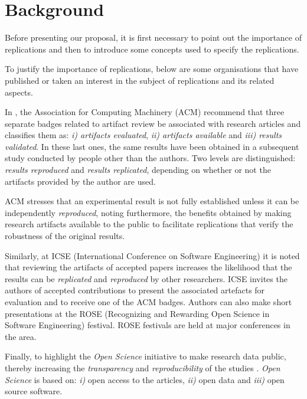 
\section{Background}
\label{sec:background}

Before presenting our proposal, it is first necessary to point out the importance of replications and then to introduce some concepts used to specify the replications.

To justify the importance of replications, below are some organisations that have published or taken an interest in the subject of replications and its related aspects.

In \cite{acm}, the Association for Computing Machinery (ACM) recommend that three separate badges related to artifact review be associated with research articles and classifies them as: \emph{i) artifacts evaluated}, \emph{ii) artifacts available} and \emph{iii) results validated}. In these last ones, the same results have been obtained in a subsequent study conducted by people other than the authors. Two levels are distinguished: \emph{results reproduced} and \emph{results replicated}, depending on whether or not the artifacts provided by the author are used.

ACM stresses that an experimental result is not fully established unless it can be independently \emph{reproduced}, noting furthermore, the benefits obtained by making research artifacts available to the public to facilitate replications that verify the robustness of the original results.

Similarly, at ICSE (International Conference
on Software Engineering) it is noted that reviewing the artifacts of accepted papers increases the likelihood that the results can be  \emph{replicated} and \emph{reproduced} by other researchers. 
ICSE invites the authors of accepted contributions to present the associated artefacts for evaluation and to receive one of the ACM badges.  Authors can also make short presentations at the ROSE (Recognizing and Rewarding Open Science in Software Engineering) festival. ROSE festivals are held at major conferences in the area.

Finally, to highlight the \emph{Open Science} initiative to make research data public, thereby increasing the \emph{transparency} and \emph{reproducibility} of the studies \cite{fernandez2019open}.
\emph{Open Science} is based on: \emph{i)} open access to the articles, \emph{ii)} open data and \emph{iii)} open source software.

